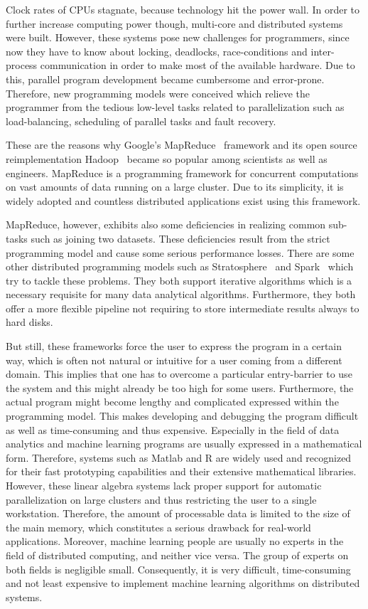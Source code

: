 \documentclass{dima}
\begin{document}
Clock rates of CPUs stagnate, because technology hit the power wall.
In order to further increase computing power though, multi-core and distributed systems were built.
However, these systems pose new challenges for programmers, since now they have to know about locking, deadlocks, race-conditions and inter-process communication in order to make most of the available hardware.
Due to this, parallel program development became cumbersome and error-prone.
Therefore, new programming models were conceived which relieve the programmer from the tedious low-level tasks related to parallelization such as load-balancing, scheduling of parallel tasks and fault recovery.

These are the reasons why Google's MapReduce~\cite{dean:c2008a} framework and its open source reimplementation Hadoop~\cite{hadoop:2008a} became so popular among scientists as well as engineers.
MapReduce is a programming framework for concurrent computations on vast amounts of data running on a large cluster. 
Due to its simplicity, it is widely adopted and countless distributed applications exist using this framework.

MapReduce, however, exhibits also some deficiencies in realizing common sub-tasks such as joining two datasets.
These deficiencies result from the strict programming model and cause some serious performance losses.
There are some other distributed programming models such as Stratosphere~\cite{battre:2010a} and Spark~\cite{zaharia:2010a} which try to tackle these problems.
They both support iterative algorithms which is a necessary requisite for many data analytical algorithms.
Furthermore, they both offer a more flexible pipeline not requiring to store intermediate results always to hard disks.

But still, these frameworks force the user to express the program in a certain way, which is often not natural or intuitive for a user coming from a different domain.
This implies that one has to overcome a particular entry-barrier to use the system and this might already be too high for some users.
Furthermore, the actual program might become lengthy and complicated expressed within the programming model.
This makes developing and debugging the program difficult as well as time-consuming and thus expensive.
Especially in the field of data analytics and machine learning programs are usually expressed in a mathematical form.
Therefore, systems such as Matlab and R are widely used and recognized for their fast prototyping capabilities and their extensive mathematical libraries.
However, these linear algebra systems lack proper support for automatic parallelization on large clusters and thus restricting the user to a single workstation.
Therefore, the amount of processable data is limited to the size of the main memory, which constitutes a serious drawback for real-world applications.
Moreover, machine learning people are usually no experts in the field of distributed computing, and neither vice versa.
The group of experts on both fields is negligible small.
Consequently, it is very difficult, time-consuming and not least expensive to implement machine learning algorithms on distributed systems.
\end{document}
